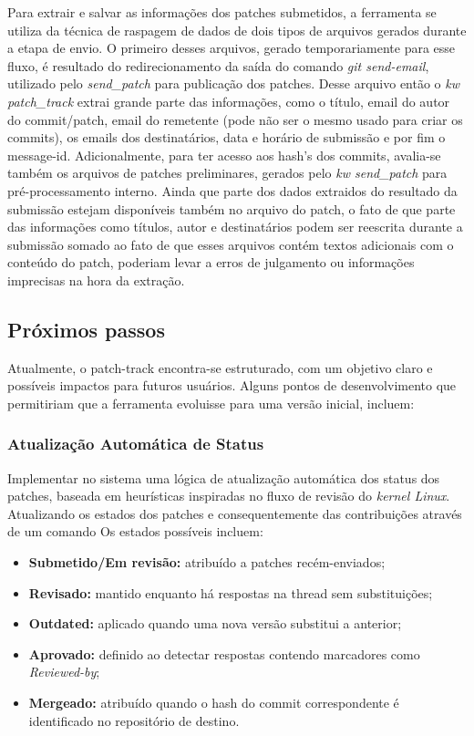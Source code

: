 Para extrair e salvar as informações dos patches submetidos, a ferramenta se utiliza da técnica de raspagem de dados de dois tipos de arquivos gerados durante a etapa de envio. O primeiro desses arquivos, gerado temporariamente para esse fluxo, é resultado do redirecionamento da saída do comando \textit{git send-email}, utilizado pelo \textit{send\_patch} para publicação dos patches. Desse arquivo então o \textit{kw patch\_track} extrai grande parte das informações, como o título, email do autor do commit/patch, email do remetente (pode não ser o mesmo usado para criar os commits), os emails dos destinatários, data e horário de submissão e por fim o message-id. Adicionalmente, para ter acesso aos hash's dos commits, avalia-se também os arquivos de patches preliminares, gerados pelo \textit{kw send\_patch} para pré-processamento interno. Ainda que parte dos dados extraidos do resultado da submissão estejam disponíveis também no arquivo do patch, o fato de que parte das informações como títulos, autor e destinatários podem ser reescrita durante a submissão somado ao fato de que esses arquivos contém textos adicionais com o conteúdo do patch, poderiam levar a erros de julgamento ou informações imprecisas na hora da extração. 

\subsection{Próximos passos}
Atualmente, o patch-track encontra-se estruturado, com um objetivo claro e possíveis impactos para futuros usuários. Alguns pontos de desenvolvimento que permitiriam que a ferramenta evoluisse para uma versão inicial, incluem:

\subsubsection{Atualização Automática de Status}
Implementar no sistema uma lógica de atualização automática dos status dos patches, baseada em heurísticas inspiradas no fluxo de revisão do \textit{kernel Linux}. Atualizando os estados dos patches e consequentemente das contribuições através de um comando
Os estados possíveis incluem:
\begin{itemize}
\item \textbf{Submetido/Em revisão:} atribuído a patches recém-enviados;
\item \textbf{Revisado:} mantido enquanto há respostas na thread sem substituições;
\item \textbf{Outdated:} aplicado quando uma nova versão substitui a anterior;
\item \textbf{Aprovado:} definido ao detectar respostas contendo marcadores como \textit{Reviewed-by};
\item \textbf{Mergeado:} atribuído quando o hash do commit correspondente é identificado no repositório de destino.
\end{itemize}


